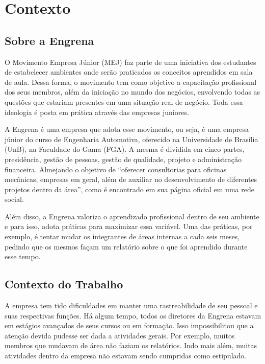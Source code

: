 \chapter{Contexto}
\label{context}

\section{Sobre a Engrena}

O Movimento Empresa Júnior (MEJ) faz parte de uma iniciativa dos estudantes de estabelecer ambientes onde serão praticados os conceitos aprendidos em sala de aula. Dessa forma, o movimento tem como objetivo a capacitação profissional dos seus membros, além da iniciação no mundo dos negócios, envolvendo todas as questões que estariam presentes em uma situação real de negócio. Toda essa ideologia é posta em prática através das empresas juniores.

A Engrena é uma empresa que adota esse movimento, ou seja, é uma empresa júnior do curso de Engenharia Automotiva, oferecido na Universidade de Brasília (UnB), na Faculdade do Gama (FGA). A mesma é dividida em cinco partes, presidência, gestão de pessoas, gestão de qualidade, projeto e administração financeira. Almejando o objetivo de “oferecer consultorias para oficinas mecânicas, empresas em geral, além de auxiliar no desenvolvimento de diferentes projetos dentro da área”, como é encontrado em sua página oficial em uma rede social.

Além disso, a Engrena valoriza o aprendizado profissional dentro de seu ambiente e para isso, adota práticas para maximizar essa variável. Uma das práticas, por exemplo, é tentar mudar os integrantes de áreas internas a cada seis meses, pedindo que os mesmos façam um relatório sobre o que foi aprendido durante esse tempo. 

\section{Contexto do Trabalho}

A empresa tem tido dificuldades em manter uma rastreabilidade de seu pessoal e suas respectivas funções. Há algum tempo, todos os diretores da Engrena estavam em estágios avançados de seus cursos ou em formação. Isso impossibilitou que a atenção devida pudesse ser dada a atividades gerais. Por exemplo, muitos membros que mudavam de área não faziam os relatórios. Indo mais além, muitas atividades dentro da empresa não estavam sendo cumpridas como estipulado.

